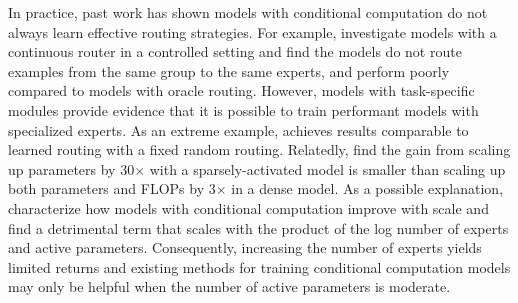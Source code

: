 \documentclass{article}
\theoremstyle{plain}
\theoremstyle{definition}
\theoremstyle{remark}
\begin{document}
In practice, past work has shown models with conditional computation do not always learn effective routing strategies.
For example, \citet{mittal2022modular} investigate models with a continuous router in a controlled setting and find the models do not route examples from the same group to the same experts, and perform poorly compared to models with oracle routing.
However, models with task-specific modules \citep{gururangan2021demix, kudugunta2021beyond} provide evidence that it is possible to train performant models with specialized experts.
As an extreme example, \citet{roller2021hash} achieves results comparable to learned routing with a fixed random routing.
Relatedly, \citet{fedus2021switch} find the gain from scaling up parameters by 30$\times$ with a sparsely-activated model is smaller than scaling up both parameters and FLOPs by 3$\times$ in a dense model.
As a possible explanation, \citet{clark2022unified} characterize how models with conditional computation improve with scale and find a detrimental term that scales with the product of the log number of experts and active parameters.
Consequently, increasing the number of experts yields limited returns and existing methods for training conditional computation models may only be helpful when the number of active parameters is moderate.
\end{document}
